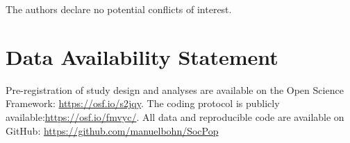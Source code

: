 \documentclass[
  english,
  man,floatsintext]{apa6}
\begin{document}
The authors declare no potential conflicts of interest.

\hypertarget{data-availability-statement}{%
\section{Data Availability Statement}\label{data-availability-statement}}

Pre-registration of study design and analyses are available on the Open Science Framework: \url{https://osf.io/s2jqy}. The coding protocol is publicly available:\url{https://osf.io/fmvyc/}. All data and reproducible code are available on GitHub: \url{https://github.com/manuelbohn/SocPop}
\end{document}
